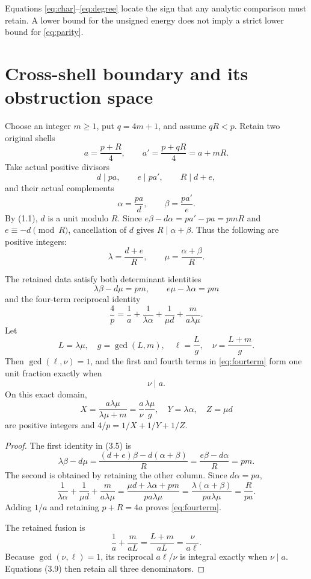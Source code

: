 Equations \eqref{eq:char}--\eqref{eq:degree} locate the sign that any analytic
comparison must retain.  A lower bound for the unsigned energy does not imply a
strict lower bound for \eqref{eq:parity}.

\section{Cross-shell boundary and its obstruction space}

Choose an integer $m\ge1$, put $q=4m+1$, and assume $qR<p$.  Retain two original
shells
\[
 a=\frac{p+R}{4},\qquad a'=\frac{p+qR}{4}=a+mR.                  \tag{3.1}
\]
Take actual positive divisors
\[
 d\mid pa,\qquad e\mid pa',\qquad R\mid d+e,                   \tag{3.2}
\]
and their actual complements
\[
 \alpha=\frac{pa}{d},\qquad \beta=\frac{pa'}e.                  \tag{3.3}
\]
By (1.1), $d$ is a unit modulo $R$.  Since
$e\beta-d\alpha=pa'-pa=pmR$ and $e\equiv-d\pmod R$, cancellation
of $d$ gives $R\mid\alpha+\beta$.  Thus the following are positive integers:
\[
 \lambda=\frac{d+e}{R},\qquad \mu=\frac{\alpha+\beta}{R}.       \tag{3.4}
\]

\begin{theorem}\label{thm:cross-shell}
The retained data satisfy both determinant identities
\[
 \boxed{\lambda\beta-d\mu=pm,\qquad e\mu-\lambda\alpha=pm}     \tag{3.5}
\]
and the four-term reciprocal identity
\[
 \boxed{
 \frac4p=\frac1a+\frac1{\lambda\alpha}+\frac1{\mu d}
 +\frac{m}{a\lambda\mu}.}                                      \tag{3.6}\label{eq:fourterm}
\]
Let
\[
 L=\lambda\mu,\quad g=\gcd(L,m),\quad
 \ell=\frac Lg,\quad \nu=\frac{L+m}{g}.                        \tag{3.7}
\]
Then $\gcd(\ell,\nu)=1$, and the first and fourth terms in
\eqref{eq:fourterm} form one unit fraction exactly when
\[
 \boxed{\nu\mid a.}                                             \tag{3.8}\label{eq:fusion}
\]
On this exact domain,
\[
 \boxed{
 X=\frac{a\lambda\mu}{\lambda\mu+m}
   =\frac a\nu\frac{\lambda\mu}{g},\quad
 Y=\lambda\alpha,\quad Z=\mu d}                                \tag{3.9}
\]
are positive integers and $4/p=1/X+1/Y+1/Z$.
\end{theorem}

\begin{proof}
The first identity in (3.5) is
\[
 \lambda\beta-d\mu
 =\frac{(d+e)\beta-d(\alpha+\beta)}R
 =\frac{e\beta-d\alpha}{R}=pm.
\]
The second is obtained by retaining the other column.  Since $d\alpha=pa$,
\[
 \frac1{\lambda\alpha}+\frac1{\mu d}
 +\frac{m}{a\lambda\mu}
 =\frac{\mu d+\lambda\alpha+pm}{pa\lambda\mu}
 =\frac{\lambda(\alpha+\beta)}{pa\lambda\mu}
 =\frac R{pa}.
\]
Adding $1/a$ and retaining $p+R=4a$ proves \eqref{eq:fourterm}.

The retained fusion is
\[
 \frac1a+\frac{m}{aL}=\frac{L+m}{aL}=\frac{\nu}{a\ell}.
\]
Because $\gcd(\nu,\ell)=1$, its reciprocal $a\ell/\nu$ is integral exactly
when $\nu\mid a$.  Equations (3.9) then retain all three denominators.
\end{proof}


